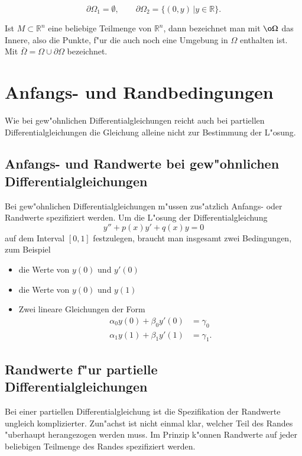 \begin{beispiel}
\[
\partial \Omega_1=\emptyset,\qquad\partial \Omega_2=\{(0,y)\,|y\in\mathbb R\}.
\]
\end{beispiel}

\begin{definition}
Ist $M\subset\mathbb R^n$ eine beliebige Teilmenge von $\mathbb R^n$,
dann bezeichnet man mit $\o \Omega$ das Innere, also die Punkte,
f"ur die auch noch eine Umgebung in $\Omega$ enthalten ist. Mit
$\bar\Omega=\Omega\cup\partial\Omega$ bezeichnet.
\end{definition}

\section{Anfangs- und Randbedingungen\label{klassifikation:randbedingungen}}
Wie bei gew"ohnlichen Differentialgleichungen reicht auch bei
partiellen Differentialgleichungen die Gleichung alleine nicht
zur Bestimmung der L"osung.
\subsection{Anfangs- und Randwerte bei gew"ohnlichen Differentialgleichungen\label{klassifkation:anfangswerte-ode}}
Bei gew"ohnlichen Differentialgleichungen
m"ussen zus"atzlich Anfangs- oder Randwerte spezifiziert werden.
Um die L"osung der Differentialgleichung
\[
y''+p(x)y'+q(x)y=0
\]
auf dem Interval $[0,1]$
festzulegen, braucht man insgesamt zwei Bedingungen, zum Beispiel
\begin{itemize}
\item die Werte von $y(0)$ und $y'(0)$
\item die Werte von $y(0)$ und $y(1)$
\item Zwei lineare Gleichungen der Form
\begin{align*}
\alpha_0y(0)+\beta_0y'(0)&=\gamma_0\\
\alpha_1y(1)+\beta_1y'(1)&=\gamma_1.
\end{align*}
\end{itemize}

\subsection{Randwerte f"ur partielle Differentialgleichungen\label{klassifikation:randwerte-pde}}
Bei einer partiellen Differentialgleichung ist die Spezifikation
der Randwerte ungleich komplizierter.
Zun"achst ist nicht einmal klar, welcher Teil des Randes
"uberhaupt herangezogen werden muss. Im Prinzip k"onnen Randwerte
auf jeder beliebigen Teilmenge des Randes spezifiziert werden.

